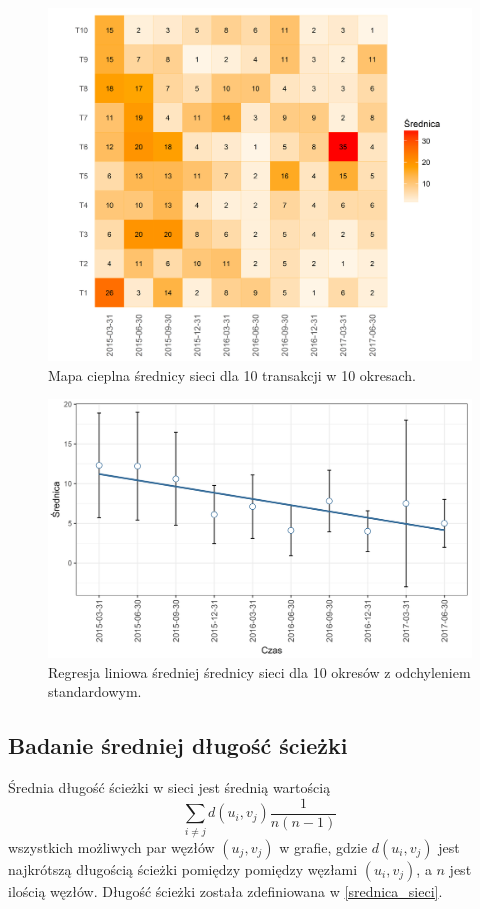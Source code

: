 \documentclass[12pt, twoside, final, openany]{mgr}
\newcommand{\chartsWidth}{0.8}
\begin{document}
\begin{figure}[H]
\centering
  \includegraphics[width=\chartsWidth\linewidth]{pictures/srednica/srednica_hm.png}
  \caption{Mapa cieplna średnicy sieci dla 10 transakcji w 10 okresach.}
  \label{fig:s1} 
\end{figure}
\begin{figure}[H]
\centering
  \includegraphics[width=\chartsWidth\linewidth]{pictures/srednica/srednica_sda.png}
  \caption{Regresja liniowa średniej średnicy sieci dla 10 okresów z odchyleniem standardowym.}
  \label{fig:s2}
\end{figure}


\subsection{Badanie średniej długość ścieżki}
\label{dlugosc_sciezki}
\indent Średnia długość ścieżki w sieci jest średnią wartością 
\begin{equation}
\label{eq:dlugosc_sciezki}
	\sum_{i \ne j}^{} d(u_i,v_j)\frac{1}{n(n-1)}
\end{equation}
wszystkich możliwych par węzłów $(u_j,v_j)$ w grafie, gdzie $d(u_i,v_j)$ jest najkrótszą długością ścieżki pomiędzy pomiędzy węzłami $(u_i,v_j)$, a $n$ jest ilością węzłów. Długość ścieżki została zdefiniowana w \ref{srednica_sieci}. 
\end{document}
